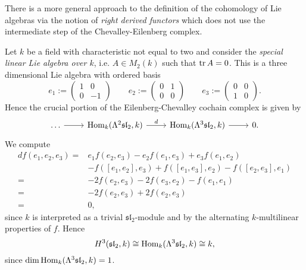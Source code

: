 \begin{remark}
	There is a more general approach to the definition of the cohomology of Lie algebras via the notion of \emph{right derived functors} which does not use the intermediate step of the Chevalley-Eilenberg complex. 
\end{remark}

\begin{example}[$H^3(\mathfrak{sl}_2,k)$]
	\label{ex:H^3_sl_2_k}
	Let $k$ be a field with characteristic not equal to two and consider the \emph{special linear Lie algebra over $k$}, i.e. $A \in M_2(k)$ such that $\operatorname{tr} A = 0$. This is a three dimensional Lie algebra with ordered basis 	
	\begin{equation*}
		e_1 := \begin{pmatrix}
			1 & 0\\
			0 & -1
		\end{pmatrix} \qquad
		e_2 := \begin{pmatrix}
			0 & 1\\
			0 & 0
		\end{pmatrix} \qquad
		e_3 := \begin{pmatrix}
			0 & 0\\
			1 & 0
		\end{pmatrix}.
	\end{equation*}
	Hence the crucial portion of the Eilenberg-Chevalley cochain complex is given by
	\begin{equation*}
		\begin{tikzcd}
			\dots \arrow[r] & \Hom_k(\Lambda^2\mathfrak{sl}_2,k) \arrow[r,"d"] & \Hom_k(\Lambda^3\mathfrak{sl}_2,k) \arrow[r] & 0.
		\end{tikzcd}
	\end{equation*}
	We compute
	\begin{align*}
		df(e_1,e_2,e_3) =& e_1f(e_2,e_3) - e_2f(e_1,e_3) + e_3f(e_1,e_2)\\
		&- f([e_1,e_2],e_3) + f([e_1,e_3],e_2) - f([e_2,e_3],e_1)\\
		=& -2f(e_2,e_3) - 2f(e_3,e_2) - f(e_1,e_1)\\
		=& -2f(e_2,e_3) + 2f(e_2,e_3)\\
		=& 0,
	\end{align*}
	\noindent since $k$ is interpreted as a trivial $\mathfrak{sl}_2$-module and by the alternating $k$-multilinear properties of $f$. Hence
	\begin{equation*}
		H^3(\mathfrak{sl}_2,k) \cong \operatorname{Hom}_k(\Lambda^3 \mathfrak{sl}_2,k) \cong k,
	\end{equation*}
	\noindent since $\dim \operatorname{Hom}_k(\Lambda^3\mathfrak{sl}_2,k) = 1$.
\end{example}

